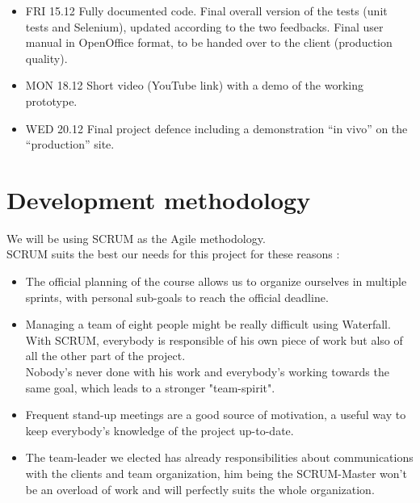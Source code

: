 \documentclass{article}
\begin{document}
\begin{itemize}
\item
FRI 15.12
Fully documented code.
Final overall version of the tests (unit tests and Selenium), updated according to the two feedbacks.
Final user manual in OpenOffice format, to be handed over to the client (production quality).

\item
MON 18.12
Short video (YouTube link) with a demo of the working prototype.

\item
WED 20.12
Final project defence including a demonstration “in vivo” on the “production” site.



\end{itemize}
\section{Development methodology}

    We will be using SCRUM as the Agile methodology.\\

    SCRUM suits the best our needs for this project for these reasons : \\

        \begin{itemize}
            \item The official planning of the course allows us to organize ourselves
            in multiple sprints, with personal sub-goals to reach the
            official deadline.
            \item Managing a team of eight people might be really difficult using
            Waterfall. With SCRUM, everybody is responsible of his own piece of
            work but also of all the other part of the project.\\
            Nobody's never done with his work and everybody's working towards the
            same goal, which leads to a stronger "team-spirit".
            \item Frequent stand-up meetings are a good source of motivation, a
            useful way to keep everybody's knowledge of the project up-to-date.
            \item The team-leader we elected has already responsibilities about
            communications with the clients and team organization, him being the
            SCRUM-Master won't be an overload of work and will perfectly suits the
            whole organization.

    \end{itemize}
\end{document}
